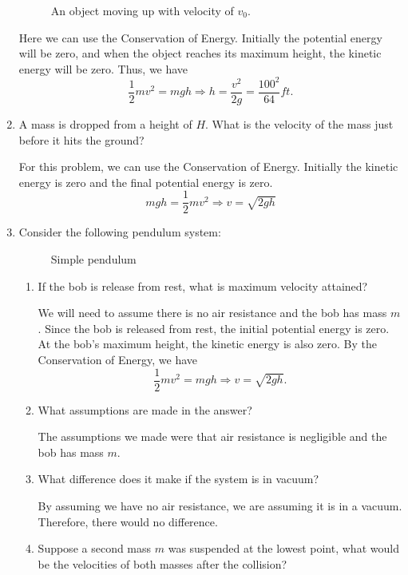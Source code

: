 \begin{enumerate}
  \begin{figure}[H]
    \centering
    
    \caption{An object moving up with velocity of \(v_0\).}
  \end{figure}
  Here we can use the Conservation of Energy.
  Initially the potential energy will be zero, and when the object reaches its
  maximum height, the kinetic energy will be zero.
  Thus, we have
  \[
  \frac{1}{2}mv^2 = mgh\Rightarrow h = \frac{v^2}{2g} = \frac{100^2}{64}ft.
  \]
\item
  A mass is dropped from a height of \(H\).
  What is the velocity of the mass just before it hits the ground?
  \par\smallskip
  For this problem, we can use the Conservation of Energy.
  Initially the kinetic energy is zero and the final potential energy is zero.
  \[
  mgh = \frac{1}{2}mv^2\Rightarrow v = \sqrt{2gh}
  \]
\item
  Consider the following pendulum system:
  \begin{figure}[H]
    \centering
    
    \caption{Simple pendulum}
  \end{figure}
  \begin{enumerate}[label = (\alph*), ref = \theenumi{(\alph*)}]
  \item
    \label{24a}
    If the bob is release from rest, what is maximum velocity attained?
    \par\smallskip
    We will need to assume there is no air resistance and the bob has mass
    \(m\).
    Since the bob is released from rest, the initial potential energy is zero.
    At the bob's maximum height, the kinetic energy is also zero.
    By the Conservation of Energy, we have
    \[
    \frac{1}{2}mv^2 = mgh\Rightarrow v = \sqrt{2gh}.
    \]
  \item
    What assumptions are made in the answer?
    \par\smallskip
    The assumptions we made were that air resistance is negligible and the bob
    has mass \(m\).
  \item
    What difference does it make if the system is in vacuum?
    \par\smallskip
    By assuming we have no air resistance, we are assuming it is in a vacuum.
    Therefore, there would no difference.
  \item
    Suppose a second mass \(m\) was suspended at the lowest point, what would
    be the velocities of both masses after the collision?

\end{enumerate}
\end{enumerate}
